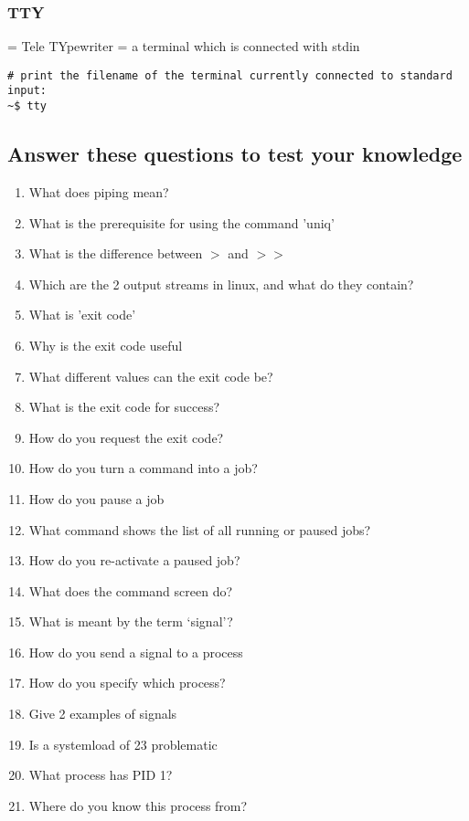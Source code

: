 \documentclass{article}
\begin{document}
\subsubsection{TTY}

= Tele TYpewriter
= a terminal which is connected with stdin

\begin{verbatim}
# print the filename of the terminal currently connected to standard input:
~$ tty
\end{verbatim}

\subsection{Answer these questions to test your knowledge}

\begin{enumerate}
    \item What does piping mean?
    \item What is the prerequisite for using the command 'uniq'
    \item What is the difference between $>$ and $>>$
    \item Which are the 2 output streams in linux, and what do they contain?
    \item What is 'exit code'
    \item Why is the exit code useful
    \item What different values can the exit code be?
    \item What is the exit code for success?
    \item How do you request the exit code?
    \item How do you turn a command into a job?
    \item How do you pause a job
    \item What command shows the list of all running or paused jobs?
    \item How do you re-activate a paused job?
    \item What does the command screen do?
    \item What is meant by the term `signal'?
    \item How do you send a signal to a process
    \item How do you specify which process?
    \item Give 2 examples of signals
    \item Is a systemload of 23 problematic
    \item What process has PID 1?
    \item Where do you know this process from?
\end{enumerate}
\end{document}
